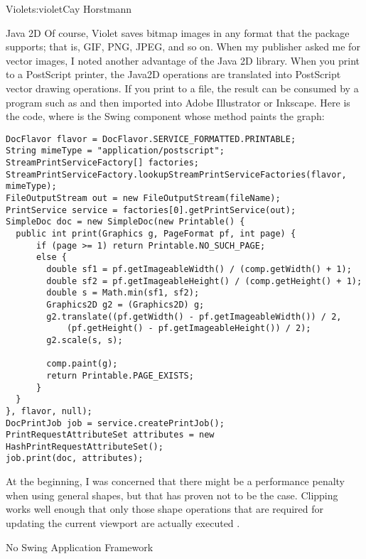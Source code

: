 \begin{aosachapter}{Violet}{s:violet}{Cay Horstmann}
\begin{aosasect1}{Java 2D}
Of course, Violet saves bitmap images in any format that the
 package supports; that is, GIF, PNG, JPEG, and so
on. When my publisher asked me for vector images, I noted another
advantage of the Java 2D library. When you print to a PostScript
printer, the Java2D operations are translated into PostScript vector
drawing operations. If you print to a file, the result can be consumed
by a program such as  and then imported into Adobe
Illustrator or Inkscape. Here is the code, where  is the
Swing component whose  method paints the graph:

\begin{verbatim}
DocFlavor flavor = DocFlavor.SERVICE_FORMATTED.PRINTABLE;
String mimeType = "application/postscript";
StreamPrintServiceFactory[] factories;
StreamPrintServiceFactory.lookupStreamPrintServiceFactories(flavor, mimeType);
FileOutputStream out = new FileOutputStream(fileName);
PrintService service = factories[0].getPrintService(out);            
SimpleDoc doc = new SimpleDoc(new Printable() {
  public int print(Graphics g, PageFormat pf, int page) {
      if (page >= 1) return Printable.NO_SUCH_PAGE;
      else {
        double sf1 = pf.getImageableWidth() / (comp.getWidth() + 1);
        double sf2 = pf.getImageableHeight() / (comp.getHeight() + 1);
        double s = Math.min(sf1, sf2);
        Graphics2D g2 = (Graphics2D) g;
        g2.translate((pf.getWidth() - pf.getImageableWidth()) / 2, 
            (pf.getHeight() - pf.getImageableHeight()) / 2);
        g2.scale(s, s);
                        
        comp.paint(g);
        return Printable.PAGE_EXISTS;
      }
  }
}, flavor, null);
DocPrintJob job = service.createPrintJob();
PrintRequestAttributeSet attributes = new HashPrintRequestAttributeSet();
job.print(doc, attributes);
\end{verbatim}

At the beginning, I was concerned that there might be a performance
penalty when using general shapes, but that has proven not to be the
case. Clipping works well enough that only those shape operations
that are required for updating the current viewport are actually
executed .

\end{aosasect1}

\begin{aosasect1}{No Swing Application Framework}


\end{aosasect1}
\end{aosachapter}
